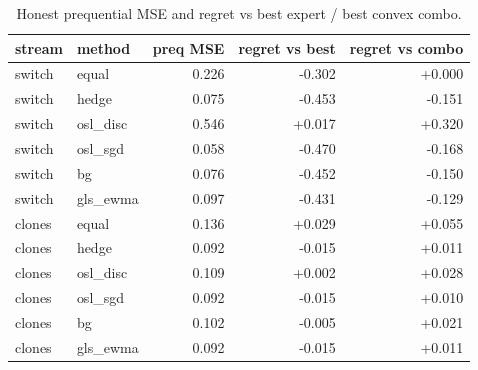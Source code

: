 \begin{table}[t]\centering
\caption{Honest prequential MSE and regret vs best expert / best convex combo.}
\label{tab:agod-online-stacking}
\begin{tabular}{llrrr}\toprule
stream & method & preq MSE & regret vs best & regret vs combo \\
\midrule
switch & equal & 0.226 & -0.302 & +0.000 \\
switch & hedge & 0.075 & -0.453 & -0.151 \\
switch & osl\_disc & 0.546 & +0.017 & +0.320 \\
switch & osl\_sgd & 0.058 & -0.470 & -0.168 \\
switch & bg & 0.076 & -0.452 & -0.150 \\
switch & gls\_ewma & 0.097 & -0.431 & -0.129 \\
clones & equal & 0.136 & +0.029 & +0.055 \\
clones & hedge & 0.092 & -0.015 & +0.011 \\
clones & osl\_disc & 0.109 & +0.002 & +0.028 \\
clones & osl\_sgd & 0.092 & -0.015 & +0.010 \\
clones & bg & 0.102 & -0.005 & +0.021 \\
clones & gls\_ewma & 0.092 & -0.015 & +0.011 \\
\bottomrule
\end{tabular}
\end{table}
